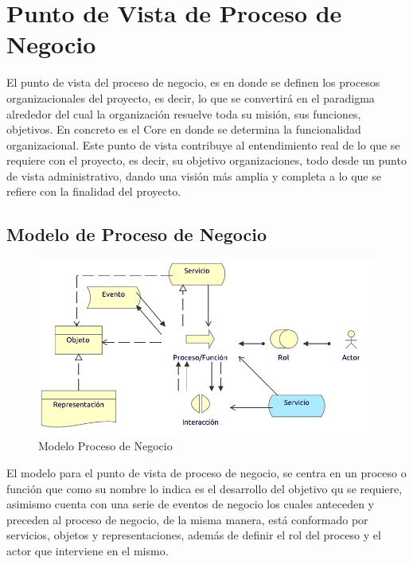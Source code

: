 \section{Punto de Vista de Proceso de Negocio}

El punto de vista del proceso de negocio, es en donde se definen los procesos organizacionales del proyecto, es decir, lo que se convertirá en el paradigma alrededor del cual la organización resuelve toda su misión, sus funciones, objetivos. En concreto es el Core en donde se determina la funcionalidad organizacional.
Este punto de vista contribuye al entendimiento real de lo que se requiere con el proyecto, es decir, su objetivo organizaciones, todo desde un punto de vista administrativo, dando una visión más amplia y completa a lo que se refiere con la finalidad del proyecto.

\subsection{Modelo de Proceso de Negocio}
\begin{figure}[h!]
	\centering
	\includegraphics[width=.8\linewidth]{imgs/modelo/ProcesoNegocio}
	\caption{Modelo Proceso de Negocio}
\end{figure}

El modelo para el punto de vista de proceso de negocio, se centra en un proceso o función que como su nombre lo indica es el desarrollo del objetivo qu se requiere, asimismo cuenta con una serie de eventos de negocio los cuales anteceden y preceden al proceso de negocio, de la misma manera, está conformado por servicios, objetos y representaciones, además de definir el rol del proceso y el actor que interviene en el mismo.

\clearpage

